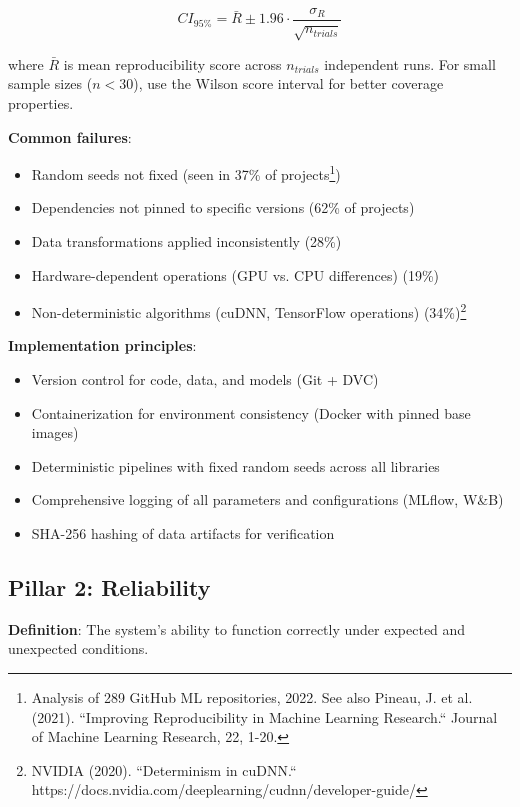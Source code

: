 \begin{equation}
CI_{95\%} = \bar{R} \pm 1.96 \cdot \frac{\sigma_R}{\sqrt{n_{trials}}}
\end{equation}

where $\bar{R}$ is mean reproducibility score across $n_{trials}$ independent runs. For small sample sizes ($n < 30$), use the Wilson score interval for better coverage properties.

\textbf{Common failures}:
\begin{itemize}
    \item Random seeds not fixed (seen in 37\% of projects\footnote{Analysis of 289 GitHub ML repositories, 2022. See also Pineau, J. et al. (2021). ``Improving Reproducibility in Machine Learning Research.`` Journal of Machine Learning Research, 22, 1-20.})
    \item Dependencies not pinned to specific versions (62\% of projects)
    \item Data transformations applied inconsistently (28\%)
    \item Hardware-dependent operations (GPU vs. CPU differences) (19\%)
    \item Non-deterministic algorithms (cuDNN, TensorFlow operations) (34\%)\footnote{NVIDIA (2020). ``Determinism in cuDNN.`` https://docs.nvidia.com/deeplearning/cudnn/developer-guide/}
\end{itemize}

\textbf{Implementation principles}:
\begin{itemize}
    \item Version control for code, data, and models (Git + DVC)
    \item Containerization for environment consistency (Docker with pinned base images)
    \item Deterministic pipelines with fixed random seeds across all libraries
    \item Comprehensive logging of all parameters and configurations (MLflow, W\&B)
    \item SHA-256 hashing of data artifacts for verification
\end{itemize}

\subsection{Pillar 2: Reliability}

\textbf{Definition}: The system's ability to function correctly under expected and unexpected conditions.


